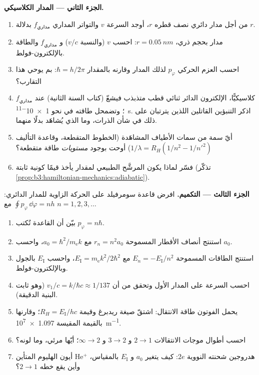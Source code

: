 \begin{problem}
\medskip\noindent\textbf{الجزء الثاني --- المدار الكلاسيكي.}
\begin{enumerate}[resume]
  \item من أجل مدار دائري نصف قطره $r$، أوجد السرعة $v$ والتواتر
        المداري $f_{\text{مداري}}$ بدلالة $r$.
  \item مدار بحجم ذري، $r = \qty{0.05}{nm}$: احسب $v$
        (والنسبة $v/c$) و $f_{\text{مداري}}$ والطاقة بالإلكترون-فولط.
  \item احسب العزم الحركي $p_\varphi$ لذلك المدار
        وقارنه بالمقدار $\hbar = h/2\pi$: بم يوحي هذا التقارب؟
  \item كلاسيكيًّا، الإلكترون الدائر ثنائي قطب متذبذب فيشعّ
        (كتاب السنة الثانية) عند $f_{\text{مداري}}$؛ وتضمحل
        طاقته في نحو \qty{1e-11}{s}. اذكر التنبؤين القاتلين
        اللذين يترتبان على ذلك في شأن الذرات، وما الذي يُشاهَد
        بدلًا منهما.
  \item أيّ سمة من سمات الأطياف المشاهَدة (الخطوط المتقطعة،
        وقاعدة التأليف $1/\lambda = R_H(1/n^2 - 1/n'^2)$) أوحت
        بوجود \emph{مستويات} طاقة متقطعة؟
  \item فسّر لماذا يكون \emph{} المرشَّح الطبيعي
        لمقدار يأخذ قيمًا كونية ثابتة
        (تذكّر \cref{prop:b3:hamiltonian-mechanics:adiabatic}).
\end{enumerate}

\medskip\noindent\textbf{الجزء الثالث --- التكميم.}
افرض قاعدة سومرفيلد على الحركة الزاوية للمدار الدائري:
$\oint p_\varphi\,\dd\varphi = nh$ مع $n = 1, 2, 3, \dots$
\begin{enumerate}[resume]
  \item بيّن أن القاعدة تُكتب $p_\varphi = n\hbar$.
  \item استنتج أنصاف الأقطار المسموحة $r_n = n^2a_0$ مع $a_0 =
        \hbar^2/m_{\text{e}}k$، واحسب $a_0$.
  \item استنتج الطاقات المسموحة $E_n = -E_{\text{I}}/n^2$ مع
        $E_{\text{I}} = m_{\text{e}}k^2/2\hbar^2$، واحسب
        $E_{\text{I}}$ بالجول وبالإلكترون-فولط.
  \item احسب السرعة على المدار الأول وتحقق من أن $v_1/c =
        k/\hbar c \approx 1/137$ (وهو ثابت البنية الدقيقة).
  \item يحمل الفوتون طاقة الانتقال: اشتقّ صيغة ريدبرغ وقيمة
        $R_H = E_{\text{I}}/hc$؛ وقارنها بالقيمة المقيسة
        \qty{1.097e7}{m^{-1}}.
  \item احسب أطوال موجات الانتقالات $2 \to 1$ و
        $3 \to 2$ و $\infty \to 2$؛ أيّها مرئي، وما لونه؟
  \item أيون الهليوم المتأين He$^+$ هدروجين شحنته النووية
        $2e$: كيف يتغير $a_0$ و $E_{\text{I}}$ بالمقياس، وأين
        يقع خطه $2 \to 1$؟
\end{enumerate}


\end{problem}
